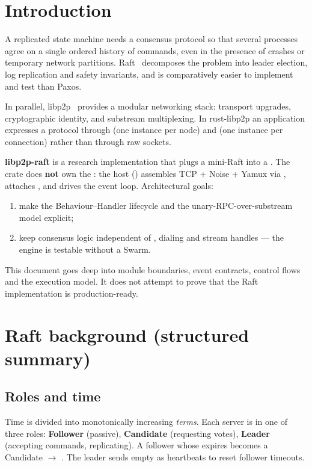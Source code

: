 \section{Introduction}

A replicated state machine needs a consensus protocol so that several processes agree on a single ordered history of commands, even in the presence of crashes or temporary network partitions. Raft~\cite{ongaro2014raft} decomposes the problem into leader election, log replication and safety invariants, and is comparatively easier to implement and test than Paxos.

In parallel, libp2p~\cite{libp2p} provides a modular networking stack: transport upgrades, cryptographic identity, and substream multiplexing. In rust-libp2p an application expresses a protocol through  (one instance per node) and  (one instance per connection) rather than through raw sockets.

\textbf{libp2p-raft} is a research implementation that plugs a mini-Raft into a . The crate does \textbf{not} own the : the host () assembles TCP + Noise + Yamux via , attaches , and drives the event loop. Architectural goals:
\begin{enumerate}[label=(\roman*), nosep]
  \item make the Behaviour--Handler lifecycle and the unary-RPC-over-substream model explicit;
  \item keep consensus logic independent of , dialing and stream handles --- the engine is testable without a Swarm.
\end{enumerate}

This document goes deep into module boundaries, event contracts, control flows and the execution model. It does not attempt to prove that the Raft implementation is production-ready.

\section{Raft background (structured summary)}

\subsection{Roles and time}

Time is divided into monotonically increasing \emph{terms}. Each server is in one of three roles: \textbf{Follower} (passive), \textbf{Candidate} (requesting votes), \textbf{Leader} (accepting commands, replicating). A follower whose  expires becomes a Candidate $\rightarrow$ . The leader sends empty  as heartbeats to reset follower timeouts.

